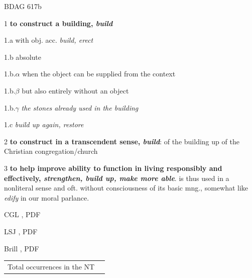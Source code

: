 				\begin{compactdesc}
					\item[BDAG 617b] \textbf{}
						\begin{compactitem}
							\item[1] \textbf{to construct a building, \textit{build}}
							\item[1.a] with obj. acc. \textit{build, erect}
							\item[1.b] absolute
							\item[1.b.$\alpha$] when the object can be supplied from the context
							\item[1.b.$\beta$] but also entirely without an object
							\item[1.b.$\gamma$]  \textit{the stones already used in the building}
							\item[1.c] \textit{build up again, restore}
							\item[2] \textbf{to construct in a transcendent sense, \textit{build}}: of the building up of the Christian congregation/church
							\item[3] \textbf{to help improve ability to function in living responsibly and effectively, \textit{strengthen, build up, make more able}}.  is thus used in a nonliteral sense and oft. without consciousness of its basic mng., somewhat like \textit{edify} in our moral parlance.
						\end{compactitem}
					\item[CGL , PDF ] \textbf{}
						\begin{compactitem}
							\item 
						\end{compactitem}
					\item[LSJ , PDF ] \textbf{}
						\begin{compactitem}
							\item 
						\end{compactitem}
					\item[Brill , PDF ] \textbf{}
						\begin{compactitem}
							\item 
						\end{compactitem}
				\end{compactdesc}
				
				\begin{tabular}{ll}
					Total occurrences in the NT & 
				\end{tabular}
				
